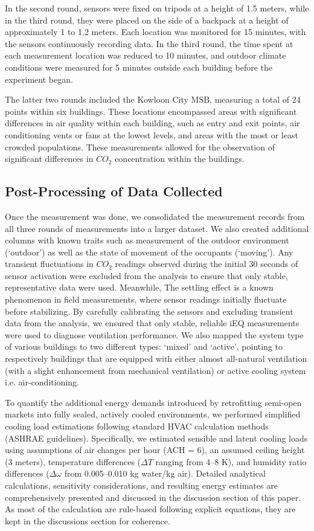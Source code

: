 \documentclass[preprint,12pt]{elsarticle}
\begin{document}
    In the second round, sensors were fixed on tripods at a height of 1.5 meters, while in the third round, they were placed on the side of a backpack at a height of approximately 1 to 1.2 meters\cite{32}. Each location was monitored for 15 minutes, with the sensors continuously recording data. In the third round, the time spent at each measurement location was reduced to 10 minutes, and outdoor climate conditions were measured for 5 minutes outside each building before the experiment began.
    
    The latter two rounds included the Kowloon City MSB, measuring a total of 24 points within six buildings. These locations encompassed areas with significant differences in air quality within each building\cite{33}, such as entry and exit points, air conditioning vents or fans at the lowest levels, and areas with the most or least crowded populations. These measurements allowed for the observation of significant differences in $CO_2$ concentration within the buildings.
    
\subsection{Post-Processing of Data Collected}
    Once the measurement was done, we consolidated the measurement records from all three rounds of measurements into a larger dataset. We also created additional columns with known traits such as measurement of the outdoor environment (`outdoor') as well as the state of movement of the occupants (`moving'). Any transient fluctuations in $CO_2$ readings observed during the initial 30 seconds of sensor activation were excluded from the analysis to ensure that only stable, representative data were used. Meanwhile, The settling effect is a known phenomenon in field measurements, where sensor readings initially fluctuate before stabilizing\cite{fradenHandbookModernSensors2016}. By carefully calibrating the sensors and excluding transient data from the analysis, we ensured that only stable, reliable iEQ measurements were used to diagnose ventilation performance. We also mapped the system type of various buildings to two different types: `mixed' and `active', pointing to respectively buildings that are equipped with either almost all-natural ventilation (with a slight enhancement from mechanical ventilation) or active cooling system i.e. air-conditioning. 
    
    To quantify the additional energy demands introduced by retrofitting semi-open markets into fully sealed, actively cooled environments, we performed simplified cooling load estimations following standard HVAC calculation methods (ASHRAE guidelines). Specifically, we estimated sensible and latent cooling loads using assumptions of air changes per hour (ACH = 6), an assumed ceiling height (3 meters), temperature differences ($\Delta T$ ranging from 4–8 K), and humidity ratio differences ($\Delta \omega $ from 0.005–0.010 kg water/kg air). Detailed analytical calculations, sensitivity considerations, and resulting energy estimates are comprehensively presented and discussed in the discussion section of this paper. As most of the calculation are rule-based following explicit equations, they are kept in the discussions section for coherence.
\end{document}
